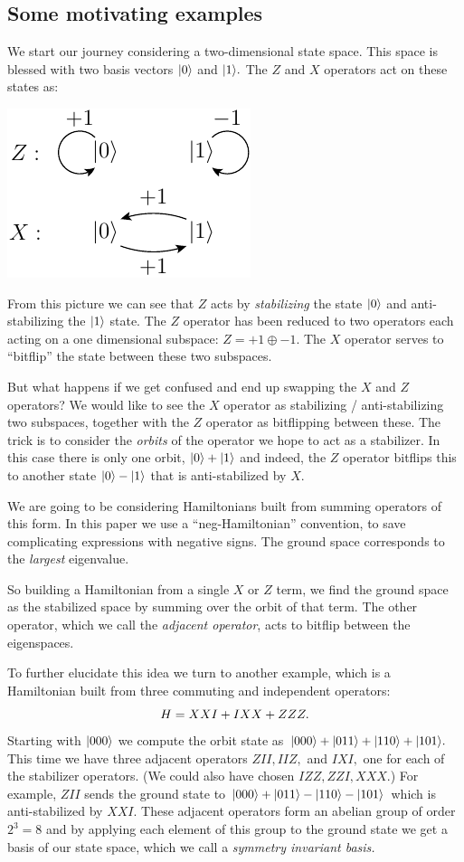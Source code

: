 \documentclass[12pt]{article}
\begin{document}
\subsection{Some motivating examples}

We start our journey considering a two-dimensional state space.
This space is blessed with two basis vectors $|{0}\rangle$ and $|{1}\rangle.$
The $Z$ and $X$ operators act on these states as:
\begin{center}
\includegraphics[]{pic-zx.pdf}
\end{center}
From this picture we can see that $Z$ acts by \emph{stabilizing} the
state $|{0}\rangle$ and anti-stabilizing the $|{1}\rangle$ state.
The $Z$ operator has been reduced 
to two operators each acting on a one dimensional subspace:
$Z = +1 \oplus -1.$
The $X$ operator serves to ``bitflip'' the state between
these two subspaces.

But what happens if we get confused and end up swapping
the $X$ and $Z$ operators? We would like to see the $X$ operator
as stabilizing / anti-stabilizing two subspaces, together with the
$Z$ operator as bitflipping between these.
The trick is to consider the \emph{orbits} of the operator
we hope to act as a stabilizer.
In this case there is only one orbit, $|{0}\rangle+|{1}\rangle$
and indeed, the $Z$ operator bitflips this to another state
$|{0}\rangle-|{1}\rangle$ that is anti-stabilized by $X.$

We are going to be considering Hamiltonians built from
summing operators of this form.
In this paper we use a ``neg-Hamiltonian'' convention,
to save complicating expressions with negative signs.
The ground space corresponds to the \emph{largest} eigenvalue.

So building a Hamiltonian from a single $X$ or $Z$ term,
we find the ground space as the stabilized space
by summing over the orbit of that term.
The other operator,
which we call the \emph{adjacent operator}, acts to bitflip
between the eigenspaces.

To further elucidate this idea we turn to another example,
which is a Hamiltonian built from three commuting and
independent operators:
$$
    H = XXI + IXX + ZZZ.
$$
Starting with $|{000}\rangle$ we compute the orbit state
as $|{000}\rangle+|{011}\rangle+|{110}\rangle+|{101}\rangle.$
This time we have three adjacent operators
$ZII, IIZ,$ and $IXI,$
one for each of the stabilizer operators.
(We could also have chosen $IZZ, ZZI, XXX.$)
For example, $ZII$ sends the ground state to
$|{000}\rangle+|{011}\rangle-|{110}\rangle-|{101}\rangle$
which is anti-stabilized by $XXI.$
These adjacent operators form an abelian group of
order $2^3 = 8$ and by applying each element of
this group to the ground state we get a basis
of our state space, which we call a \emph{symmetry
invariant basis.}
\end{document}
